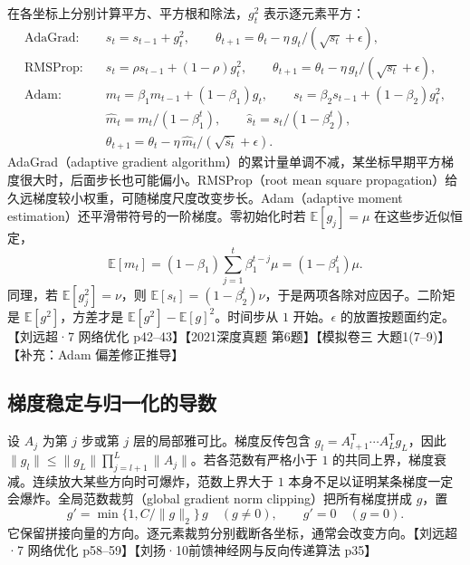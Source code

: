 \documentclass[UTF8,a4paper,zihao=-4,fontset=fandol]{ctexrep}
\begin{document}
在各坐标上分别计算平方、平方根和除法，$g_t^2$ 表示逐元素平方：
\begin{align*}
 \text{AdaGrad:}\quad& s_t=s_{t-1}+g_t^2,\qquad
 \theta_{t+1}=\theta_t-\eta\,g_t/(\sqrt{s_t}+\epsilon),\\
 \text{RMSProp:}\quad& s_t=\rho s_{t-1}+(1-\rho)g_t^2,\qquad
 \theta_{t+1}=\theta_t-\eta\,g_t/(\sqrt{s_t}+\epsilon),\\
 \text{Adam:}\quad& m_t=\beta_1 m_{t-1}+(1-\beta_1)g_t,\qquad
 s_t=\beta_2 s_{t-1}+(1-\beta_2)g_t^2,\\
 &\widehat m_t=m_t/(1-\beta_1^t),\qquad
 \widehat s_t=s_t/(1-\beta_2^t),\\
 &\theta_{t+1}=\theta_t-\eta\,\widehat m_t/(\sqrt{\widehat s_t}+\epsilon).
\end{align*}
AdaGrad（adaptive gradient algorithm）的累计量单调不减，某坐标早期平方梯度很大时，后面步长也可能偏小。RMSProp（root mean square propagation）给久远梯度较小权重，可随梯度尺度改变步长。Adam（adaptive moment estimation）还平滑带符号的一阶梯度。零初始化时若 $\mathbb E[g_j]=\mu$ 在这些步近似恒定，
\[
 \mathbb E[m_t]=(1-\beta_1)\sum_{j=1}^t\beta_1^{t-j}\mu
               =(1-\beta_1^t)\mu.
\]
同理，若 $\mathbb E[g_j^2]=\nu$，则 $\mathbb E[s_t]=(1-\beta_2^t)\nu$，于是两项各除对应因子。二阶矩是 $\mathbb E[g^2]$，方差才是 $\mathbb E[g^2]-\mathbb E[g]^2$。时间步从 $1$ 开始。$\epsilon$ 的放置按题面约定。【刘远超·7 网络优化 p42--43】【2021深度真题 第6题】【模拟卷三 大题1(7--9)】【补充：Adam 偏差修正推导】

\subsection*{梯度稳定与归一化的导数}

设 $A_j$ 为第 $j$ 步或第 $j$ 层的局部雅可比。梯度反传包含 $g_l=A_{l+1}^{\mathsf T}\cdots A_L^{\mathsf T}g_L$，因此
$\|g_l\|\le\|g_L\|\prod_{j=l+1}^L\|A_j\|$。若各范数有严格小于 $1$ 的共同上界，梯度衰减。连续放大某些方向时可爆炸，范数上界大于 $1$ 本身不足以证明某条梯度一定会爆炸。全局范数裁剪（global gradient norm clipping）把所有梯度拼成 $g$，置
\[
 g'=\min\{1,C/\|g\|_2\}\,g\quad(g\ne0),\qquad g'=0\quad(g=0).
\]
它保留拼接向量的方向。逐元素裁剪分别截断各坐标，通常会改变方向。【刘远超·7 网络优化 p58--59】【刘扬·10前馈神经网与反向传递算法 p35】
\end{document}
